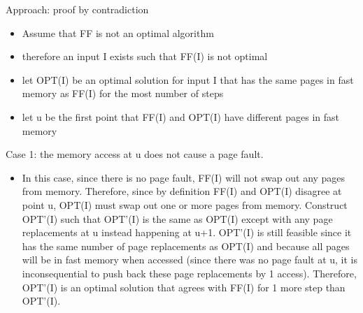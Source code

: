 \documentclass[a4paper]{article}
\begin{document}
Approach: proof by contradiction
\begin{itemize}
\item Assume that FF is not an optimal algorithm
\item therefore an input I exists such that FF(I) is not optimal
\item let OPT(I) be an optimal solution for input I that has the same pages in fast memory as FF(I) for the most number of steps
\item let u be the first point that FF(I) and OPT(I) have different pages in fast memory
\end{itemize}

Case 1: the memory access at u does not cause a page fault. 
\begin{itemize}
\item In this case, since there is no page fault, FF(I) will not swap out any pages from memory. Therefore, since by definition FF(I) and OPT(I) disagree at point u, OPT(I) must swap out one or more pages from memory. Construct OPT'(I) such that OPT'(I) is the same as OPT(I) except with any page replacements at u instead happening at u+1. OPT'(I) is still feasible since it has the same number of page replacements as OPT(I) and because all pages will be in fast memory when accessed (since there was no page fault at u, it is inconsequential to push back these page replacements by 1 access). Therefore, OPT'(I) is an optimal solution that agrees with FF(I) for 1 more step than OPT'(I).
\end{itemize}
\end{document}
